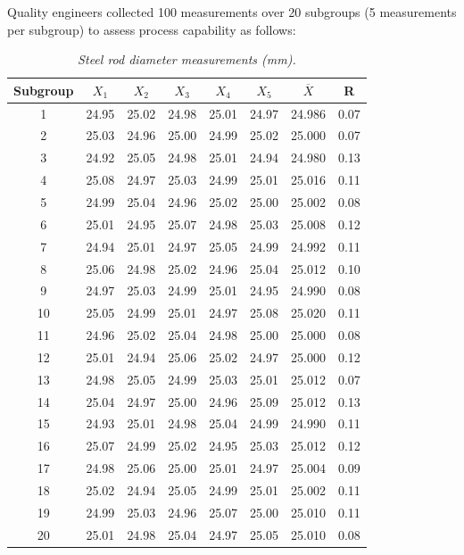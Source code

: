\documentclass[twoside]{book}
\begin{document}
Quality engineers collected 100 measurements over 20 subgroups (5 measurements per subgroup) to assess process capability as follows:

\begin{table}[H]
\centering
\begin{tabular}{c|c|c|c|c|c|c|c}
\toprule
\textbf{Subgroup} & $ {X_1} $ & $ {X_2} $ & $ {X_3} $ & $ {X_4} $ & $ {X_5} $ & $\overline{X}$ & {R} \\
\midrule
1 & 24.95 & 25.02 & 24.98 & 25.01 & 24.97 & 24.986 & 0.07 \\
2 & 25.03 & 24.96 & 25.00 & 24.99 & 25.02 & 25.000 & 0.07 \\
3 & 24.92 & 25.05 & 24.98 & 25.01 & 24.94 & 24.980 & 0.13 \\
4 & 25.08 & 24.97 & 25.03 & 24.99 & 25.01 & 25.016 & 0.11 \\
5 & 24.99 & 25.04 & 24.96 & 25.02 & 25.00 & 25.002 & 0.08 \\
6 & 25.01 & 24.95 & 25.07 & 24.98 & 25.03 & 25.008 & 0.12 \\
7 & 24.94 & 25.01 & 24.97 & 25.05 & 24.99 & 24.992 & 0.11 \\
8 & 25.06 & 24.98 & 25.02 & 24.96 & 25.04 & 25.012 & 0.10 \\
9 & 24.97 & 25.03 & 24.99 & 25.01 & 24.95 & 24.990 & 0.08 \\
10 & 25.05 & 24.99 & 25.01 & 24.97 & 25.08 & 25.020 & 0.11 \\
11 & 24.96 & 25.02 & 25.04 & 24.98 & 25.00 & 25.000 & 0.08 \\
12 & 25.01 & 24.94 & 25.06 & 25.02 & 24.97 & 25.000 & 0.12 \\
13 & 24.98 & 25.05 & 24.99 & 25.03 & 25.01 & 25.012 & 0.07 \\
14 & 25.04 & 24.97 & 25.00 & 24.96 & 25.09 & 25.012 & 0.13 \\
15 & 24.93 & 25.01 & 24.98 & 25.04 & 24.99 & 24.990 & 0.11 \\
16 & 25.07 & 24.99 & 25.02 & 24.95 & 25.03 & 25.012 & 0.12 \\
17 & 24.98 & 25.06 & 25.00 & 25.01 & 24.97 & 25.004 & 0.09 \\
18 & 25.02 & 24.94 & 25.05 & 24.99 & 25.01 & 25.002 & 0.11 \\
19 & 24.99 & 25.03 & 24.96 & 25.07 & 25.00 & 25.010 & 0.11 \\
20 & 25.01 & 24.98 & 25.04 & 24.97 & 25.05 & 25.010 & 0.08 \\
\midrule
\end{tabular}
\caption{\textit{Steel rod diameter measurements (mm).}}
\end{table}
\end{document}
